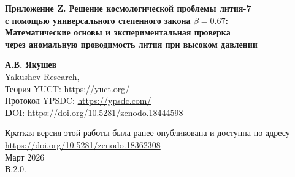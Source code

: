 \documentclass[12pt,a4paper]{article}
\theoremstyle{remark}
\begin{document}
	
	\begin{titlepage}
		\begin{center}
			\vspace*{0cm}
			
			\Huge \textbf{Приложение Z. Решение космологической проблемы лития-7} \\
			\Huge \textbf{с помощью универсального степенного закона \(\beta = 0.67\):} \\
			\Huge \textbf{Математические основы и экспериментальная проверка} \\
			\Huge \textbf{через аномальную проводимость лития при высоком давлении}
			
			\vspace{0.5cm}
			\Large \textbf{А.В. Якушев} \\
			\large Yakushev Research, \\ 
			Теория YUCT: \url{https://yuct.org/}\\
			Протокол YPSDC: \url{https://ypsdc.com/}\\
			
			\vspace{2cm}
			\textbf DOI: \url{https://doi.org/10.5281/zenodo.18444598}\\
			
			\vspace{1cm}
			
			\vspace{0cm}
			\large 
			Краткая версия этой работы была ранее опубликована и доступна по адресу\\ \url{https://doi.org/10.5281/zenodo.18362308}\\
			\vspace{1cm}
			Март 2026 \\ \large В.2.0.
			
			
			\newpage
			\begin{minipage}{0.85\textwidth}
				\begin{abstract}
					\noindent
					Мы представляем строгий математический вывод универсального закона проводимости \(\sigma \propto (q-1)^{-\beta}\) с показателем \(\beta = 0.67\), следующего из объединяющей теории координации Якушева (YUCT). Используя экспериментальные данные по аномальному сопротивлению лития при ударном сжатии до 210 ГПа (Fortov, Yakushev и др., 2001), мы калибруем модель и демонстрируем, что наблюдаемое 15-кратное увеличение сопротивления является прямым следствием координационных эффектов. Предложены три слепых экспериментальных предсказания, включая изотопный эффект в проводимости \(\sigma_6/\sigma_7 = (7/6)^{0.74} \approx 1.115\), который служит решающей проверкой теории. Полученные результаты замыкают круг от космологического лития к лабораторным измерениям и устанавливают \(\beta = 0.67\) как новую фундаментальную константу.
				\end{abstract}
			\end{minipage}
			

\end{center}
\end{titlepage}
\end{document}
